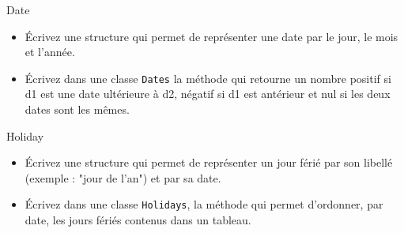 \documentclass[a4paper,11pt]{article}
\begin{document}
	\begin{Exercice}{Date}
		\begin{itemize}
			\item
				Écrivez une structure qui permet de représenter une date par le jour, le mois et l'année.
			\item 
				Écrivez dans une classe \texttt{Dates} la méthode  qui retourne un nombre positif si d1 est une date ultérieure à d2, négatif si d1 est antérieur et nul si les deux dates sont les mêmes.
		\end{itemize}		
	\end{Exercice}

	\begin{Exercice}{Holiday}
		\begin{itemize}
			\item
				Écrivez une structure qui permet de représenter un jour férié par son libellé (exemple : "jour de l'an") et par sa date.
			\item 
				Écrivez dans une classe \texttt{Holidays}, la méthode  qui permet d'ordonner, par date, les jours fériés contenus dans un tableau.
		\end{itemize}		
	\end{Exercice}
\end{document}
